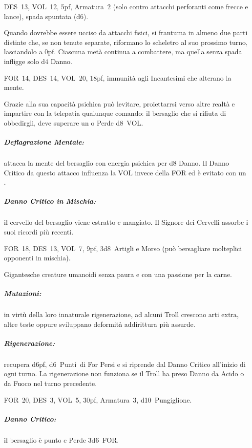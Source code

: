 \documentclass[itdr]{subfiles}
\begin{document}
\vfill

DES~13, VOL~12, 5pf, Armatura~2 (solo contro attacchi perforanti come frecce e lance), spada spuntata (d6).

Quando dovrebbe essere ucciso da attacchi fisici, si frantuma in almeno due parti distinte che, se non tenute separate, riformano lo scheletro al suo prossimo turno, lasciandolo a 0pf. Ciascuna metà continua a combattere, ma quella senza spada infligge solo d4 Danno.

\vfill

FOR~14, DES~14, VOL~20, 18pf, immunità agli Incantesimi che alterano la mente.

Grazie alla sua capacità psichica può levitare, proiettarrsi verso altre realtà e impartire con la telepatia qualunque comando: il bersaglio che si rifiuta di obbedirgli, deve superare un  o Perde d8~VOL.

\subparagraph{Deflagrazione Mentale:} attacca la mente del bersaglio con energia psichica per d8 Danno. Il Danno Critico da questo attacco influenza la VOL invece della FOR ed è evitato con un .

\subparagraph{Danno Critico in Mischia:} il cervello del bersaglio viene estratto e mangiato. Il Signore dei Cervelli assorbe i suoi ricordi più recenti.

\break

FOR~18, DES~13, VOL~7, 9pf, 3d8~Artigli e Morso (può bersagliare molteplici opponenti in mischia).

Gigantesche creature umanoidi senza paura e con una passione per la carne.

\subparagraph{Mutazioni:} in virtù della loro innaturale rigenerazione, ad alcuni Troll crescono arti extra, altre teste oppure sviluppano deformità addirittura più assurde.

\subparagraph{Rigenerazione:} recupera d6pf, d6~Punti~di For Persi e si riprende dal Danno Critico all'inizio di ogni turno. La rigenerazione non funziona se il Troll ha preso Danno da Acido o da Fuoco nel turno precedente.

\vfill


\vspace{-1ex}

FOR~20, DES~3, VOL~5, 30pf, Armatura~3, d10~Pungiglione.

\subparagraph{Danno Critico:} il bersaglio è punto e Perde 3d6~FOR.
\end{document}
